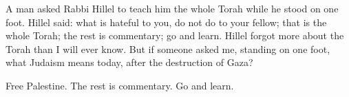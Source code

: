 A man asked Rabbi Hillel to teach him the whole Torah while he stood on one foot. Hillel said: what is hateful to you, do not do to your fellow; that is the whole Torah; the rest is commentary; go and learn. Hillel forgot more about the Torah than I will ever know. But if someone asked me, standing on one foot, what Judaism means today, after the destruction of Gaza?

Free Palestine. The rest is commentary. Go and learn.
